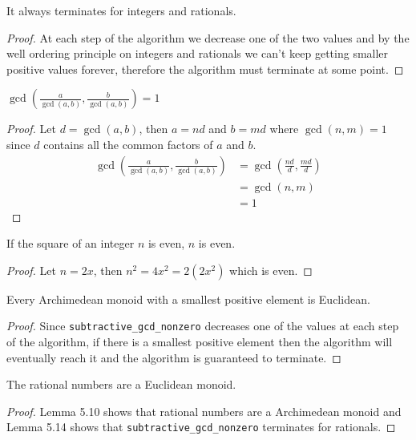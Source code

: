 \begin{lemma}
	It always terminates for integers and rationals.
\end{lemma}

\begin{proof}
	At each step of the algorithm we decrease one of the two values and by the well ordering principle
	on integers and rationals we can't keep getting smaller positive values forever, therefore the
	algorithm must terminate at some point.
\end{proof}

\begin{lemma}
	$\gcd(\frac{a}{\gcd(a, b)}, \frac{b}{\gcd(a, b)}) = 1$
\end{lemma}

\begin{proof}
	Let $d = \gcd(a, b)$, then $a = nd$ and $b = md$ where $\gcd(n, m) = 1$ since $d$ contains
	all the common factors of $a$ and $b$.
	\begin{align*}
		\gcd(\frac{a}{\gcd(a, b)}, \frac{b}{\gcd(a, b)})
		&= \gcd(\frac{nd}{d}, \frac{md}{d})\\
		&= \gcd(n, m)\\
		&= 1
	\end{align*}
\end{proof}

\begin{lemma}
	If the square of an integer $n$ is even, $n$ is even.
\end{lemma}

\begin{proof}
	Let $n = 2x$, then $n^2 = 4x^2 = 2(2x^2)$ which is even.
\end{proof}

\begin{lemma}
	Every Archimedean monoid with a smallest positive element is Euclidean.
\end{lemma}

\begin{proof}
	Since \verb|subtractive_gcd_nonzero| decreases one of the values at each
	step of the algorithm, if there is a smallest positive element then the
	algorithm will eventually reach it and the algorithm is guaranteed to
	terminate.
\end{proof}

\begin{lemma}
	The rational numbers are a Euclidean monoid.
\end{lemma}

\begin{proof}
	Lemma 5.10 shows that rational numbers are a Archimedean monoid and
	Lemma 5.14 shows that \verb|subtractive_gcd_nonzero| terminates for
	rationals.
\end{proof}
